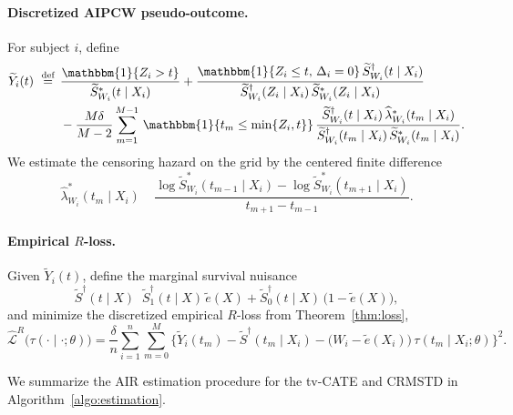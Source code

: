 \documentclass{article}
\DeclareMathOperator*{\eqdef }{\,\stackrel{\text{def}}{=}\,}
\DeclareMathOperator{\IDF}{\mathbbm{1}}%
\begin{document}
\paragraph{Discretized AIPCW pseudo-outcome.}
For subject $i$, define
\[
\begin{aligned}
\widetilde{Y}_i(t)
\;\eqdef\;&\frac{\IDF\{Z_i>t\}}{\widetilde{S}^{*}_{W_i}(t\mid X_i)}
+ \frac{\IDF\{Z_i\le t,\,\Delta_i=0\}\,\widetilde{S}^{\dag}_{W_i}(t\mid X_i)}{\widetilde{S}^{\dag}_{W_i}(Z_i\mid X_i)\,\widetilde{S}^{*}_{W_i}(Z_i\mid X_i)}\\
&-\frac{M\delta}{M-2}\sum_{m=1}^{M-1}\,\IDF\{t_m\le \min\{Z_i,t\}\}\,
\frac{\widetilde{S}^{\dag}_{W_i}(t\mid X_i)\,\widehat{\lambda}^{*}_{W_i}(t_m\mid X_i)}{\widetilde{S}^{\dag}_{W_i}(t_m\mid X_i)\,\widetilde{S}^{*}_{W_i}(t_m\mid X_i)}.
\end{aligned}
\]
We estimate the censoring hazard on the grid by the centered finite difference
\[
\widehat{\lambda}^{*}_{W_i}(t_m\mid X_i)
\;\eqdef\;
\frac{\log \widetilde{S}^{*}_{W_i}(t_{m-1}\mid X_i)-\log \widetilde{S}^{*}_{W_i}(t_{m+1}\mid X_i)}{t_{m+1}-t_{m-1}}.
\]

\paragraph{Empirical \(R\)-loss.}
Given $\widetilde{Y}_i(t)$, define the marginal survival nuisance
\[
\widetilde{S}^{\dag}(t\mid X)
\eqdef
\widetilde{S}_1^{\dag}(t\mid X)\,\tilde e(X)
+\widetilde{S}_0^{\dag}(t\mid X)\,\big(1-\tilde e(X)\big),
\]
and minimize the discretized empirical $R$-loss from Theorem~\ref{thm:loss},
\[
\widehat{\mathcal{L}}^{R}\!\big(\tau(\cdot\mid\cdot;\theta)\big)
=
\frac{\delta}{n}\sum_{i=1}^{n}\sum_{m=0}^{M}
\Big\{\widetilde{Y}_i(t_m)
-\widetilde{S}^{\dag}(t_m\mid X_i)
-\big(W_i-\tilde e(X_i)\big)\,\tau(t_m\mid X_i;\theta)
\Big\}^{2}.
\]

We summarize the AIR estimation procedure for the tv-CATE and CRMSTD in Algorithm~\ref{algo:estimation}.
\end{document}
